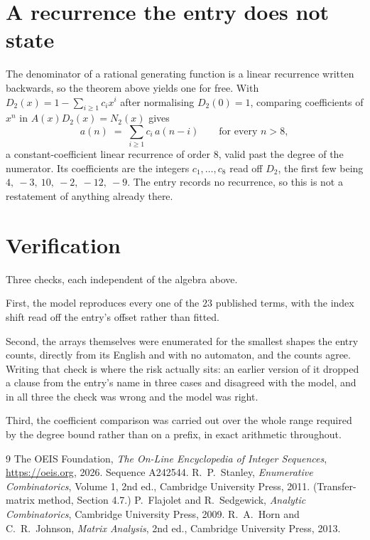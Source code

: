 \documentclass[11pt,a4paper]{article}
\theoremstyle{plain}
\theoremstyle{definition}
\begin{document}
\section{A recurrence the entry does not state}

The denominator of a rational generating function is a linear recurrence written backwards, so
the theorem above yields one for free. With $D_2(x)=1-\sum_{i\ge1}c_ix^i$ after normalising
$D_2(0)=1$, comparing coefficients of $x^n$ in $A(x)D_2(x)=N_2(x)$ gives
\[
a(n)\;=\;\sum_{i\ge1}c_i\,a(n-i)\qquad\text{for every }n>8,
\]
a constant-coefficient linear recurrence of order $8$, valid past the degree of the
numerator. Its coefficients are the integers $c_1,\dots,c_{8}$ read off $D_2$, the first few being $4,\ -3,\ 10,\ -2,\ -12,\ -9$. The entry records no recurrence, so this is not a restatement of anything
already there.

\section{Verification}

Three checks, each independent of the algebra above.

First, the model reproduces every one of the $23$ published terms, with the index shift
read off the entry's offset rather than fitted.

Second, the arrays themselves were enumerated for the smallest shapes the entry counts,
directly from its English and with no automaton, and the counts agree. Writing that check is
where the risk actually sits: an earlier version of it dropped a clause from the entry's name
in three cases and disagreed with the model, and in all three the check was wrong and the model
was right.

Third, the coefficient comparison was carried out over the whole range required by the degree
bound rather than on a prefix, in exact arithmetic throughout.

\begin{thebibliography}{9}
 The OEIS Foundation, \emph{The On-Line Encyclopedia of Integer
Sequences}, \url{https://oeis.org}, 2026. Sequence A242544.
 R.~P.~Stanley, \emph{Enumerative Combinatorics}, Volume 1, 2nd ed.,
Cambridge University Press, 2011. (Transfer-matrix method, Section 4.7.)
 P.~Flajolet and R.~Sedgewick, \emph{Analytic Combinatorics}, Cambridge
University Press, 2009.
 R.~A.~Horn and C.~R.~Johnson, \emph{Matrix Analysis}, 2nd ed., Cambridge
University Press, 2013.
\end{thebibliography}
\end{document}
